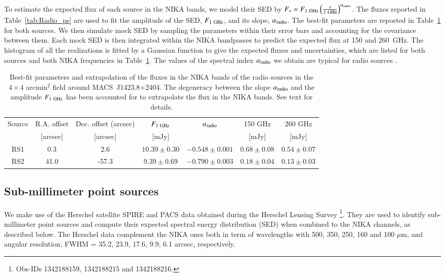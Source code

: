 \documentclass[twocolumn,traditabstract]{aa}
\begin{document}
To estimate the expected flux of each source in the NIKA bands, we model their SED by $F_{\nu} = F_{1 \ {\rm GHz}} \left(\frac{\nu}{1 \ {\rm GHz}}\right)^{\alpha_{\rm radio}}$. The fluxes reported in Table~\ref{tab:Radio_ps} are used to fit the amplitude of the SED, $F_{1 \ {\rm GHz}}$, and its slope, $\alpha_{\rm radio}$. The best-fit parameters are reported in Table~\ref{tab:Radio_ps2} for both sources. We then simulate mock SED by sampling the parameters within their error bars and accounting for the covariance between them. Each mock SED is then integrated within the NIKA bandpasses to predict the expected flux at 150 and 260~GHz. The histogram of all the realizations is fitted by a Gaussian function to give the expected fluxes and uncertainties, which are listed for both sources and both NIKA frequencies in Table~\ref{tab:Radio_ps2}. The values of the spectral index $\alpha_{\rm radio}$ we obtain are typical for radio sources \citep[see for example][]{witzel1979}.
\begin{table}[h]
\caption{Best-fit parameters and extrapolation of the fluxes in the NIKA bands of the radio sources in the $4 \times 4$ arcmin$^2$ field around \mbox{MACS~J1423.8+2404}. The degeneracy between the slope $\alpha_{\rm radio}$ and the amplitude $F_{1 \ {\rm GHz}}$ has been accounted for to extrapolate the flux in the NIKA bands. See text for details.}
\begin{center}
\begin{tabular}{ccccccc}
\hline
\hline
Source & R.A. offset & Dec. offset (arcsec) & $F_{1 \ {\rm GHz}}$ & $\alpha_{\rm radio}$ & 150 GHz & 260 GHz \\
 & [arcsec] & [arcsec] & [mJy] & & [mJy] & [mJy] \\
\hline
RS1 &      0.3 &      2.6 & $   10.39 \pm     0.30$ & $  -0.548 \pm    0.001$ & $    0.68 \pm     0.08$ & $    0.54 \pm     0.07$ \\
RS2 &     41.0 &    -57.3 & $    9.39 \pm     0.69$ & $  -0.790 \pm    0.003$ & $    0.18 \pm     0.04$ & $    0.13 \pm     0.03$ \\
\hline
\end{tabular}
\end{center}
\label{tab:Radio_ps2}
\end{table}

\subsection{Sub-millimeter point sources}
We make use of the Herschel satellite SPIRE \citep{griffin2010} and PACS \citep{poglitsch2010} data obtained during the Herschel Lensing Survey \citep[HLS,][]{egami2010,rawle2012}\footnote{Obs-IDs 1342188159, 1342188215 and 1342188216.}. They are used to identify sub-millimeter point sources and compute their expected spectral energy distribution (SED) when combined to the NIKA channels, as described below. The Herschel data complement the NIKA ones both in term of wavelengths with 500, 350, 250, 160 and 100 $\mu$m, and angular resolution, FWHM = 35.2, 23.9, 17.6, 9.9, 6.1 arcsec, respectively.
\end{document}
